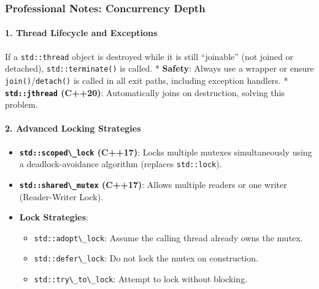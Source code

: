 \hypertarget{professional-notes-concurrency-depth}{%
\subsubsection{Professional Notes: Concurrency
Depth}\label{professional-notes-concurrency-depth}}

\hypertarget{thread-lifecycle-and-exceptions}{%
\paragraph{1. Thread Lifecycle and
Exceptions}\label{thread-lifecycle-and-exceptions}}

If a \passthrough{\lstinline!std::thread!} object is destroyed while it
is still ``joinable'' (not joined or detached),
\passthrough{\lstinline!std::terminate()!} is called. * \textbf{Safety}:
Always use a wrapper or ensure
\passthrough{\lstinline!join()!}/\passthrough{\lstinline!detach()!} is
called in all exit paths, including exception handlers. *
\textbf{\passthrough{\lstinline!std::jthread!} (C++20)}: Automatically
joins on destruction, solving this problem.

\hypertarget{advanced-locking-strategies}{%
\paragraph{2. Advanced Locking
Strategies}\label{advanced-locking-strategies}}

\begin{itemize}
\tightlist
\item
  \textbf{\passthrough{\lstinline!std::scoped\_lock!} (C++17)}: Locks
  multiple mutexes simultaneously using a deadlock-avoidance algorithm
  (replaces \passthrough{\lstinline!std::lock!}).
\item
  \textbf{\passthrough{\lstinline!std::shared\_mutex!} (C++17)}: Allows
  multiple readers or one writer (Reader-Writer Lock).
\item
  \textbf{Lock Strategies}:

  \begin{itemize}
  \tightlist
  \item
    \passthrough{\lstinline!std::adopt\_lock!}: Assume the calling
    thread already owns the mutex.
  \item
    \passthrough{\lstinline!std::defer\_lock!}: Do not lock the mutex on
    construction.
  \item
    \passthrough{\lstinline!std::try\_to\_lock!}: Attempt to lock
    without blocking.
  \end{itemize}
\end{itemize}

